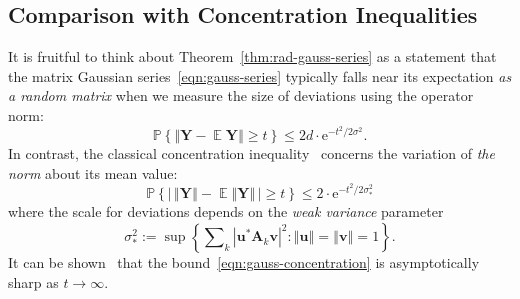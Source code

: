 \documentclass[11pt,letterpaper,twoside,reqno,draft]{amsart}
\theoremstyle{remark}
\numberwithin{equation}{section}
\numberwithin{thm}{section}
\begin{document}
\subsection{Comparison with Concentration Inequalities}

It is fruitful to think about Theorem~\ref{thm:rad-gauss-series} as a statement that the matrix Gaussian series~\eqref{eqn:gauss-series} typically falls near its expectation \emph{as a random matrix} when we measure the size of deviations using the operator norm:
\begin{equation} \label{eqn:matrix-gauss-concentration}
{\mathbb{P}\left\{ {{ {\left\Vert {{ {\bm{{Y}}} - {\operatorname{\mathbb{E}}} {\bm{{Y}}} }} \right\Vert} \geq t }} \right\}} \leq 2d \cdot {\mathrm{e}}^{-t^2/2\sigma^2}.
\end{equation}
In contrast, the classical concentration inequality~\cite[Thm.~1.7.6]{Bog98:Gaussian-Measures} concerns the variation of \emph{the norm} about its mean value:
\begin{equation} \label{eqn:gauss-concentration}
{\mathbb{P}\left\{ {{ {\left\vert {{ \, {\left\Vert {{ {\bm{{Y}}} }} \right\Vert}
	- {\operatorname{\mathbb{E}}} {\left\Vert {{ {\bm{{Y}}} }} \right\Vert} \, }} \right\vert} \geq t }} \right\}}
	\leq 2 \cdot {\mathrm{e}}^{- t^2 / 2 \sigma_{*}^2}
\end{equation}
where the scale for deviations depends on the \emph{weak variance} parameter
\begin{equation} \label{eqn:gauss-weak-var}
\sigma_{*}^2 := \sup \left\{ 
\sum\nolimits_k {{{\left\vert {{{ {\bm{{u}}}^{*} {\bm{{A}}}_k {\bm{{v}}} }}} \right\vert}}^2} :
{\left\Vert {{{\bm{{u}}}}} \right\Vert} = {\left\Vert {{{\bm{{v}}}}} \right\Vert} = 1 \right\}.
\end{equation}
It can be shown~\cite[Cor.~3.2]{LT91:Probability-Banach} that the bound~\eqref{eqn:gauss-concentration} is asymptotically sharp as $t \to \infty$.
\end{document}
